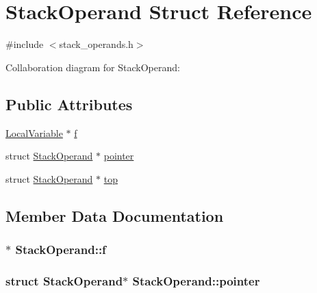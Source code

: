 \hypertarget{structStackOperand}{}\section{Stack\+Operand Struct Reference}
\label{structStackOperand}


{\ttfamily \#include $<$stack\+\_\+operands.\+h$>$}



Collaboration diagram for Stack\+Operand\+:
\subsection*{Public Attributes}
\begin{DoxyCompactItemize}
\item 
\hyperlink{structLocalVariable}{Local\+Variable} $\ast$ \hyperlink{structStackOperand_ac2430d118d01240603507706e8a8adff}{f}
\item 
struct \hyperlink{structStackOperand}{Stack\+Operand} $\ast$ \hyperlink{structStackOperand_af4ad4c3c4e49be261c61b3856bc02b9f}{pointer}
\item 
struct \hyperlink{structStackOperand}{Stack\+Operand} $\ast$ \hyperlink{structStackOperand_a11a33c73ab08f65a14fb53af2308d052}{top}
\end{DoxyCompactItemize}


\subsection{Member Data Documentation}
\subsubsection[{\texorpdfstring{f}{f}}]{$\ast$ Stack\+Operand\+::f}\hypertarget{structStackOperand_ac2430d118d01240603507706e8a8adff}{}\label{structStackOperand_ac2430d118d01240603507706e8a8adff}
\subsubsection[{\texorpdfstring{pointer}{pointer}}]{\setlength{\rightskip}{0pt plus 5cm}struct {\bf Stack\+Operand}$\ast$ Stack\+Operand\+::pointer}\hypertarget{structStackOperand_af4ad4c3c4e49be261c61b3856bc02b9f}{}\label{structStackOperand_af4ad4c3c4e49be261c61b3856bc02b9f}
